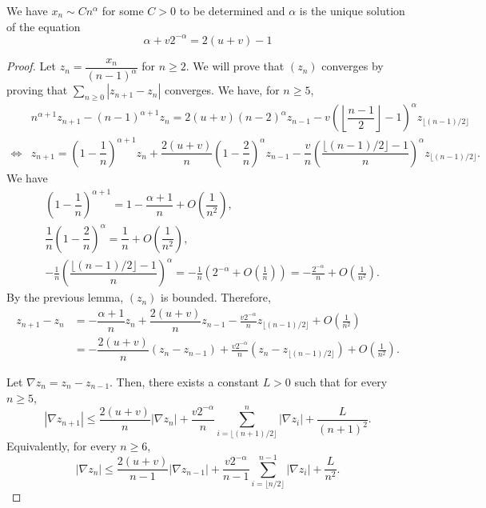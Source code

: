 \begin{theorem}
  We have $x_n \sim Cn^\alpha$ for some $C>0$ to be determined and $\alpha$ is the unique solution of the equation
  $$\alpha + v2^{-\alpha} = 2(u+v)-1$$
\end{theorem}

\begin{proof}
  Let $z_n=\dfrac{x_n}{(n-1)^\alpha}$ for $n\ge 2$. We will prove that $(z_n)$ converges by proving that $\sum_{n\ge 0}|z_{n+1}-z_n|$ converges. We have, for $n\ge 5$,
  \begin{align*}
         & n^{\alpha+1}z_{n+1} - (n-1)^{\alpha+1}z_n = 2(u+v)(n-2)^{\alpha}z_{n-1} - v\left(\left\lfloor \dfrac{n-1}{2}\right\rfloor-1\right)^{\alpha}z_{\lfloor (n-1)/2\rfloor}                                                 \\
    \iff & z_{n+1} = \left(1-\dfrac{1}{n}\right)^{\alpha+1}z_n + \dfrac{2(u+v)}{n}\left(1-\dfrac{2}{n}\right)^{\alpha}z_{n-1} - \dfrac{v}{n}\left(\dfrac{\lfloor (n-1)/2\rfloor-1}{n}\right)^{\alpha}z_{\lfloor (n-1)/2\rfloor}.
  \end{align*}
  We have
  \begin{align*}
     & \left(1-\dfrac{1}{n}\right)^{\alpha+1} = 1 - \dfrac{\alpha+1}{n} + O\left(\dfrac{1}{n^2}\right),                                                                                                  \\
     & \dfrac{1}{n}\left(1-\dfrac{2}{n}\right)^{\alpha} = \dfrac{1}{n} + O\left(\dfrac{1}{n^2}\right),                                                                                                   \\
     & -\frac{1}{n}\left(\dfrac{\lfloor (n-1)/2\rfloor-1}{n}\right)^{\alpha}=-\frac{1}{n} \left( 2^{-\alpha} + O\left(\frac{1}{n}\right) \right) = -\frac{2^{-\alpha}}{n} + O\left(\frac{1}{n^2}\right).
  \end{align*}
  By the previous lemma, $(z_n)$ is bounded. Therefore,
  \begin{align*}
    z_{n+1}-z_n
     & = -\dfrac{\alpha+1}{n}z_n + \dfrac{2(u+v)}{n}z_{n-1} - \frac{v2^{-\alpha}}{n}z_{\lfloor (n-1)/2\rfloor} + O\left(\frac{1}{n^2}\right) \\
     & = -\dfrac{2(u+v)}{n}(z_n-z_{n-1}) + \frac{v2^{-\alpha}}{n}(z_{n}-z_{\lfloor (n-1)/2\rfloor}) + O\left(\frac{1}{n^2}\right).
  \end{align*}

  Let $\nabla z_n = z_{n} - z_{n-1}$. Then, there exists a constant $L>0$ such that for every $n\ge 5$,
  $$|\nabla z_{n+1}| \le \dfrac{2(u+v)}{n}|\nabla z_{n}| + \frac{v2^{-\alpha}}{n}\sum_{i=\lfloor (n+1)/2\rfloor}^{n}|\nabla z_{i}| + \dfrac{L}{(n+1)^2}.$$
  Equivalently, for every $n\ge 6$,
  $$|\nabla z_n| \le \dfrac{2(u+v)}{n-1}|\nabla z_{n-1}| + \frac{v2^{-\alpha}}{n-1}\sum_{i=\lfloor n/2\rfloor}^{n-1}|\nabla z_{i}| + \dfrac{L}{n^2}.$$


\end{proof}
